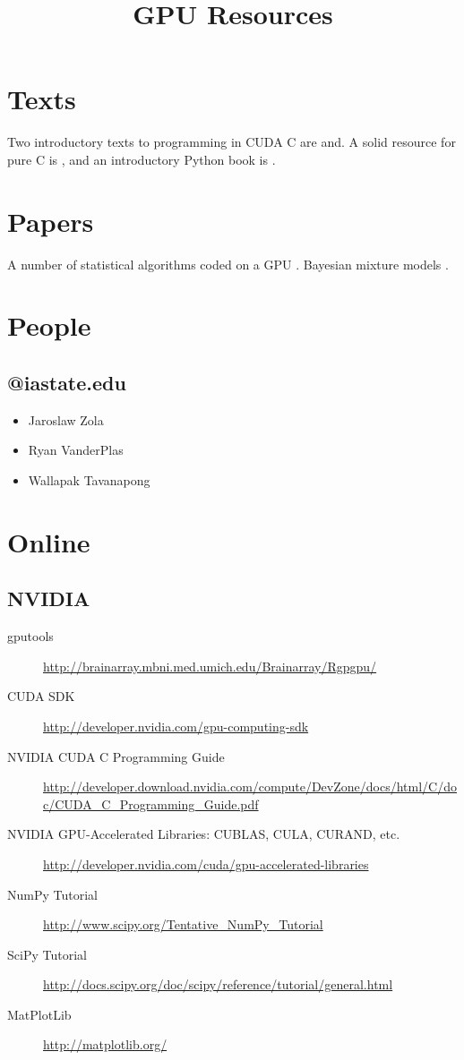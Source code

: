 \documentclass{article}
\title{GPU Resources}
\begin{document}
 

\section{Texts}

Two introductory texts to programming in CUDA C are \cite{sanders2010cuda} and\cite{kirk2010programming}. A solid resource for pure C is \cite{kernighan}, and an introductory Python book is \cite{beazley}.

\section{Papers}

A number of statistical algorithms coded on a GPU \citep{lee2010utility}. Bayesian mixture models \citep{suchard2010understanding}.

\section{People}

\subsection{@iastate.edu}

\begin{itemize}
\item Jaroslaw Zola
\item Ryan VanderPlas
\item Wallapak Tavanapong
\end{itemize}

\section{Online}

\subsection{NVIDIA}

\begin{description}
\item[gputools] \url{http://brainarray.mbni.med.umich.edu/Brainarray/Rgpgpu/}
\item[CUDA SDK] \url{http://developer.nvidia.com/gpu-computing-sdk} 
\item[NVIDIA CUDA C Programming Guide] \url{http://developer.download.nvidia.com/compute/DevZone/docs/html/C/doc/CUDA_C_Programming_Guide.pdf}
\item[NVIDIA GPU-Accelerated Libraries: CUBLAS, CULA, CURAND, etc.] \url{http://developer.nvidia.com/cuda/gpu-accelerated-libraries}
\item[NumPy Tutorial] \url{http://www.scipy.org/Tentative\_NumPy\_Tutorial}
\item[SciPy Tutorial] \url{http://docs.scipy.org/doc/scipy/reference/tutorial/general.html}
\item[MatPlotLib] \url{http://matplotlib.org/}
\end{description}





\end{document}
